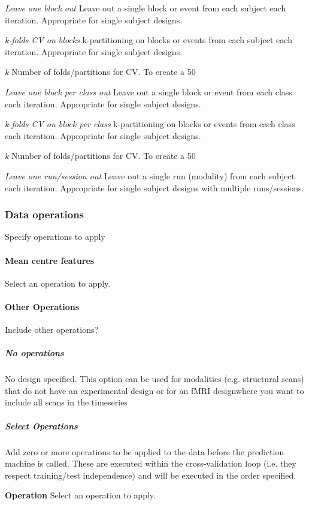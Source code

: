 \textit{Leave one block out}
Leave out a single block or event from each subject each iteration. Appropriate for single subject designs.


\textit{k-folds CV on blocks}
k-partitioning on blocks or events from each subject each iteration. Appropriate for single subject designs.


\textit{k}
Number of folds/partitions for CV. To create a 50%


\textit{Leave one block per class out}
Leave out a single block or event from each class each iteration. Appropriate for single subject designs.


\textit{k-folds CV on block per class}
k-partitioning on blocks or events from each class each iteration. Appropriate for single subject designs.


\textit{k}
Number of folds/partitions for CV. To create a 50%


\textit{Leave one run/session out}
Leave out a single run (modality) from each subject each iteration. Appropriate for single subject designs with multiple runs/sessions.


\subsubsection{Data operations}
Specify operations to apply


\paragraph{Mean centre features}
Select an operation to apply.


\paragraph{Other Operations}
Include other operations?


\subparagraph{No operations}
No design specified. This option can be used for modalities (e.g. structural scans) that do not have an experimental design or for an fMRI designwhere you want to include all scans in the timeseries


\subparagraph{Select Operations}
Add zero or more operations to be applied to the data before the prediction machine is called. These are executed within the cross-validation loop (i.e. they respect training/test independence) and will be executed in the order specified. 


\textbf{Operation}
Select an operation to apply.

